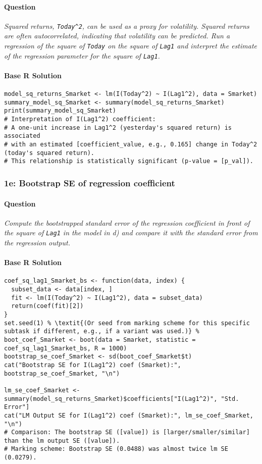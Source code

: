 \documentclass[12pt,a4paper]{article}
\newcommand{\Robject}[1]{\texttt{#1}} %
\newcommand{\Rcode}[1]{\texttt{#1}} %
\begin{document}
        \paragraph{Question}
        \textit{Squared returns, \Rcode{Today\textasciicircum{}2}, can be used as a proxy for volatility. Squared returns are often autocorrelated, indicating that volatility can be predicted. Run a regression of the square of \Robject{Today} on the square of \Robject{Lag1} and interpret the estimate of the regression parameter for the square of \Robject{Lag1}.}
        \paragraph{Base R Solution}
\begin{lstlisting}[]
model_sq_returns_Smarket <- lm(I(Today^2) ~ I(Lag1^2), data = Smarket)
summary_model_sq_Smarket <- summary(model_sq_returns_Smarket)
print(summary_model_sq_Smarket)
# Interpretation of I(Lag1^2) coefficient:
# A one-unit increase in Lag1^2 (yesterday's squared return) is associated
# with an estimated [coefficient_value, e.g., 0.165] change in Today^2 (today's squared return).
# This relationship is statistically significant (p-value = [p_val]).
\end{lstlisting}

    \subsubsection{1e: Bootstrap SE of regression coefficient}
        \paragraph{Question}
        \textit{Compute the bootstrapped standard error of the regression coefficient in front of the square of \Robject{Lag1} in the model in d) and compare it with the standard error from the regression output.}
        \paragraph{Base R Solution}
\begin{lstlisting}[]
coef_sq_lag1_Smarket_bs <- function(data, index) {
  subset_data <- data[index, ]
  fit <- lm(I(Today^2) ~ I(Lag1^2), data = subset_data)
  return(coef(fit)[2]) 
}
set.seed(1) % \textit{(Or seed from marking scheme for this specific subtask if different, e.g., if a variant was used.)} %
boot_coef_Smarket <- boot(data = Smarket, statistic = coef_sq_lag1_Smarket_bs, R = 1000)
bootstrap_se_coef_Smarket <- sd(boot_coef_Smarket$t)
cat("Bootstrap SE for I(Lag1^2) coef (Smarket):", bootstrap_se_coef_Smarket, "\n")

lm_se_coef_Smarket <- summary(model_sq_returns_Smarket)$coefficients["I(Lag1^2)", "Std. Error"]
cat("LM Output SE for I(Lag1^2) coef (Smarket):", lm_se_coef_Smarket, "\n")
# Comparison: The bootstrap SE ([value]) is [larger/smaller/similar] than the lm output SE ([value]).
# Marking scheme: Bootstrap SE (0.0488) was almost twice lm SE (0.0279).
\end{lstlisting}
\end{document}
